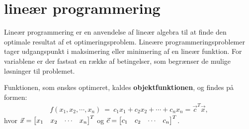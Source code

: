 \chapter{lineær programmering}

\begin{comment}
Ting til retter
- bør "def 5.5 mulige løsninger og den mulige mængde" komme før "standard maksimums- og minimumsproblemer"? %
- Jeg er ikke sikker på alle termer i dette afsnit. Jeg rettede kriteriefunktion til objektfunktion, da der blev brugt objektfunktion i projektforslaget.
- Jeg er lidt inkonsistent med anvendelsen af [1 2 3] og [1,2,3]. er ikke helt sikker på hvad der ser bedst ud. %
- Er der brug for at skrive betingelserne og objektfunktionen ud i starten, eller er det nok at det skrives som vektor-vektor produkt?
\end{comment}

Lineær programmering er en anvendelse af lineær algebra til at finde den optimale resultat af et optimeringsproblem. Lineære programmeringsproblemer tager udgangspunkt i maksimering eller minimering af en lineær funktion. For variablene er der fastsat en række af betingelser, som begrænser de mulige løsninger til problemet.


Funktionen, som ønskes optimeret, kaldes \textbf{objektfunktionen}, og findes på formen:
\begin{align}
f(x_1,x_2,\cdots , x_n)\ =\ c_1x_1 + c_2x_2 + \cdots + c_nx_n = \vec{c}^T \vec{x},
\end{align}
hvor $\vec{x}= \begin{bmatrix} x_1 & x_2 & \cdots & x_n \end{bmatrix}^T$ og $\vec{c}= \begin{bmatrix} c_1 & c_2 & \cdots & c_n \end{bmatrix}^T$.
\begin{comment}
Bør muligvis være en defintion, behøver ikke at skrives ud, men så skal f(\vec{x}) frem for f(x_1, ..., x_n).  Men det er jo variable repræcenteret ved en vektor så måske introducerer f(x_1, ..., x_n), udenfor definitionen.
\begin{defn}
Betragt et lineært programmerings problem, da er \textbf{objektfunktionen}
\begin{align*}
f(\vec{x}) = \vec{c}^T \cdot \vec{x}, 
\end{align*}
for $\vec{x}, \vec{c} \in \mathds{R}^n$, funktionen, som ønskes optimeret.
\end{defn} Eller noget, det er vigtigt at denne definition, vil kræve at vektor x og c bliver introduceret i den bindende tekst.
\end{comment}


